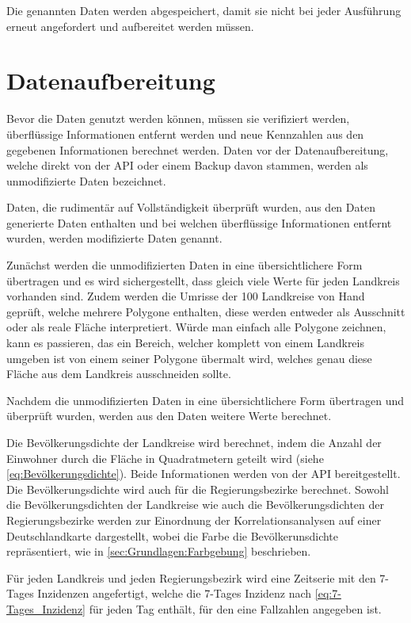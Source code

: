 Die genannten Daten werden abgespeichert, damit sie nicht bei jeder Ausführung erneut angefordert und aufbereitet werden müssen.
\section{Datenaufbereitung}
Bevor die Daten genutzt werden können, müssen sie verifiziert werden, überflüssige Informationen entfernt werden und neue Kennzahlen aus den gegebenen Informationen berechnet werden. Daten vor der Datenaufbereitung, welche direkt von der API oder einem Backup davon stammen, werden als \glqq{}unmodifizierte\grqq{} Daten bezeichnet. 

Daten, die rudimentär auf Vollständigkeit überprüft wurden, aus den Daten generierte Daten enthalten und bei welchen überflüssige Informationen entfernt wurden, werden \glqq{}modifizierte\grqq{} Daten genannt.

Zunächst werden die unmodifizierten Daten in eine übersichtlichere Form übertragen und es wird sichergestellt, dass gleich viele Werte für jeden Landkreis vorhanden sind. Zudem werden die Umrisse der 100 Landkreise von Hand geprüft, welche mehrere Polygone enthalten, diese werden entweder als Ausschnitt oder als reale Fläche interpretiert. Würde man einfach alle Polygone zeichnen, kann es passieren, das ein Bereich, welcher komplett von einem Landkreis umgeben ist von einem seiner Polygone übermalt wird, welches genau diese Fläche aus dem Landkreis ausschneiden sollte.

Nachdem die unmodifizierten Daten in eine übersichtlichere Form übertragen und überprüft wurden, werden aus den Daten weitere Werte berechnet.

Die Bevölkerungsdichte der Landkreise wird berechnet, indem die Anzahl der Einwohner durch die Fläche in Quadratmetern geteilt wird (siehe \autoref{eq:Bevölkerungsdichte}). Beide Informationen werden von der API bereitgestellt.
Die Bevölkerungsdichte wird auch für die Regierungsbezirke berechnet. 
Sowohl die Bevölkerungsdichten der Landkreise wie auch die Bevölkerungsdichten der Regierungsbezirke werden zur Einordnung der Korrelationsanalysen auf einer Deutschlandkarte dargestellt, wobei die Farbe die Bevölkerunsdichte repräsentiert, wie in \autoref{sec:Grundlagen:Farbgebung} beschrieben.

Für jeden Landkreis und jeden Regierungsbezirk wird eine Zeitserie mit den 7-Tages Inzidenzen angefertigt, welche die 7-Tages Inzidenz nach \autoref{eq:7-Tages_Inzidenz} für jeden Tag enthält, für den eine Fallzahlen angegeben ist. 

